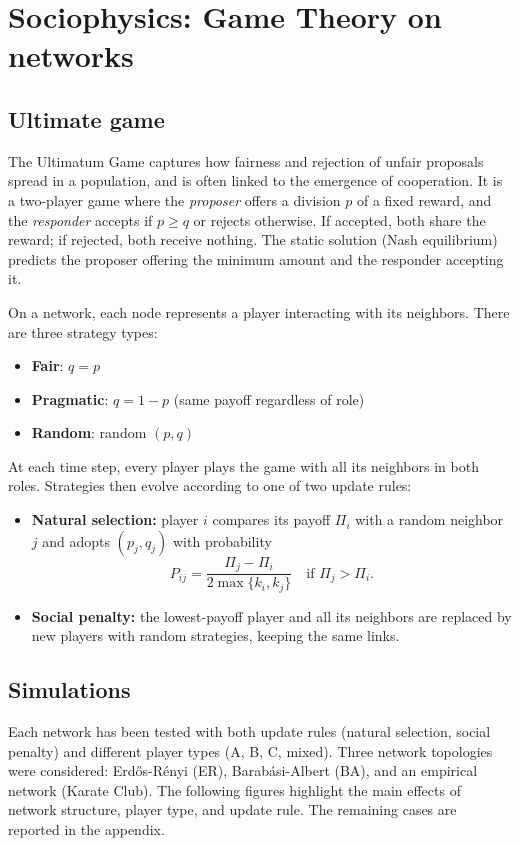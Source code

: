 \chapter{Sociophysics: Game Theory on networks}

 
\section{Ultimate game}
The Ultimatum Game captures \cite{sinatra2009ultimatum} how fairness and rejection of unfair proposals spread
in a population, and is often linked to the emergence of cooperation.  
It is a two-player game where the \emph{proposer} offers a division $p$ of a fixed
reward, and the \emph{responder} accepts if $p \geq q$ or rejects otherwise.  
If accepted, both share the reward; if rejected, both receive nothing.  
The static solution (Nash equilibrium) predicts the proposer offering the
minimum amount and the responder accepting it.

On a network, each node represents a player interacting with its neighbors.  
There are three strategy types:
\begin{itemize}
    \item \textbf{Fair}: $q = p$
    \item \textbf{Pragmatic}: $q = 1-p$ (same payoff regardless of role)
    \item \textbf{Random}: random $(p,q)$
\end{itemize}

At each time step, every player plays the game with all its neighbors in both
roles. Strategies then evolve according to one of two update rules:
\begin{itemize}
    \item \textbf{Natural selection:} player $i$ compares its payoff $\Pi_i$ with
    a random neighbor $j$ and adopts $(p_j,q_j)$ with probability
    \[
      P_{ij} = \frac{\Pi_j - \Pi_i}{2 \max \{ k_i, k_j \}} \quad \text{if } \Pi_j > \Pi_i.
    \]
    \item \textbf{Social penalty:} the lowest-payoff player and all its neighbors
    are replaced by new players with random strategies, keeping the same links.
\end{itemize}

\section{Simulations}
Each network has been tested with both update rules (natural selection, social
penalty) and different player types (A, B, C, mixed). Three network topologies
were considered: Erdős-Rényi (ER), Barabási-Albert (BA), and an empirical
network (Karate Club).  
The following figures highlight the main effects of network structure, player
type, and update rule. The remaining cases are reported in the appendix.

